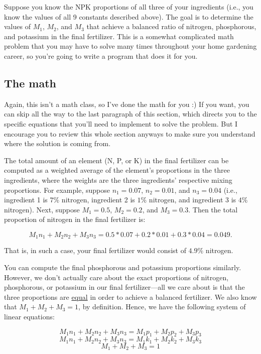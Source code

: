 \documentclass{article}
\begin{document}
Suppose you know the NPK proportions of all three of your ingredients (i.e., you know the values of all 9 constants described above). The goal is to determine the values of $M_1$, $M_2$, and $M_3$ that achieve a balanced ratio of nitrogen, phosphorous, and potassium in the final fertilizer. This is a somewhat complicated math problem that you may have to solve many times throughout your home gardening career, so you're going to write a program that does it for you.

\subsection{The math}

Again, this isn't a math class, so I've done the math for you :) If you want, you can skip all the way to the last paragraph of this section, which directs you to the specific equations that you'll need to implement to solve the problem. But I encourage you to review this whole section anyways to make sure you understand where the solution is coming from.

The total amount of an element (N, P, or K) in the final fertilizer can be computed as a weighted average of the element's proportions in the three ingredients, where the weights are the three ingredients' respective mixing proportions. For example, suppose $n_1=0.07$, $n_2=0.01$, and $n_3=0.04$ (i.e., ingredient 1 is $7\%$ nitrogen, ingredient 2 is $1\%$ nitrogen, and ingredient 3 is $4\%$ nitrogen). Next, suppose $M_1=0.5$, $M_2=0.2$, and $M_3=0.3$. Then the total proportion of nitrogen in the final fertilizer is:

\begin{equation*}
M_1n_1 + M_2n_2 + M_3n_3 = 0.5*0.07 + 0.2*0.01 + 0.3*0.04 = 0.049.
\end{equation*}

That is, in such a case, your final fertilizer would consist of $4.9\%$ nitrogen.

You can compute the final phosphorous and potassium proportions similarly. However, we don't actually care about the exact proportions of nitrogen, phosphorous, or potassium in our final fertilizer---all we care about is that the three proportions are \ul{equal} in order to achieve a balanced fertilizer. We also know that $M_1 + M_2 + M_3 = 1$, by definition. Hence, we have the following system of linear equations:

\begin{equation}
    \label{eq:mixing1}
    M_1n_1 + M_2n_2 + M_3n_3 = M_1p_1 + M_2p_2 + M_3p_3
\end{equation}
\begin{equation}
    \label{eq:mixing2}
    M_1n_1 + M_2n_2 + M_3n_3 = M_1k_1 + M_2k_2 + M_3k_3
\end{equation}
\begin{equation}
    \label{eq:mixing_sum}
    M_1 + M_2 + M_3 = 1
\end{equation}
\end{document}
